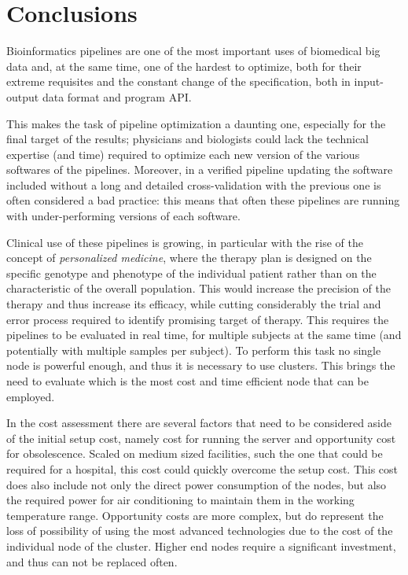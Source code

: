 \documentclass{standalone}
\begin{document}
\section*{Conclusions}

Bioinformatics pipelines are one of the most important uses of biomedical big data and, at the same time, one of the hardest to optimize, both for their extreme requisites and the constant change of the specification, both in input-output data format and program API.

This makes the task of pipeline optimization a daunting one, especially for the final target of the results; physicians and biologists could lack the technical expertise (and time) required to optimize each new version of the various softwares of the pipelines.
Moreover, in a verified pipeline updating the software included without a long and detailed cross-validation with the previous one is often considered a bad practice: this means that often these pipelines are running with under-performing versions of each software.

Clinical use of these pipelines is growing, in particular with the rise of the concept of \emph{personalized medicine}, where the therapy plan is designed on the specific genotype and phenotype of the individual patient rather than on the characteristic of the overall population.
This would increase the precision of the therapy and thus increase its efficacy, while cutting considerably the trial and error process required to identify promising target of therapy.
This requires the pipelines to be evaluated in real time, for multiple subjects at the same time (and potentially with multiple samples per subject).
To perform this task no single node is powerful enough, and thus it is necessary to use clusters.
This brings the need to evaluate which is the most cost and time efficient node that can be employed.

In the cost assessment there are several factors that need to be considered aside of the initial setup cost, namely cost for running the server and opportunity cost for obsolescence.
Scaled on medium sized facilities, such the one that could be required for a hospital, this cost could quickly overcome the setup cost.
This cost does also include not only the direct power consumption of the nodes, but also the required power for air conditioning to maintain them in the working temperature range.
Opportunity costs are more complex, but do represent the loss of possibility of using the most advanced technologies due to the cost of the individual node of the cluster.
Higher end nodes require a significant investment, and thus can not be replaced often.
\end{document}

